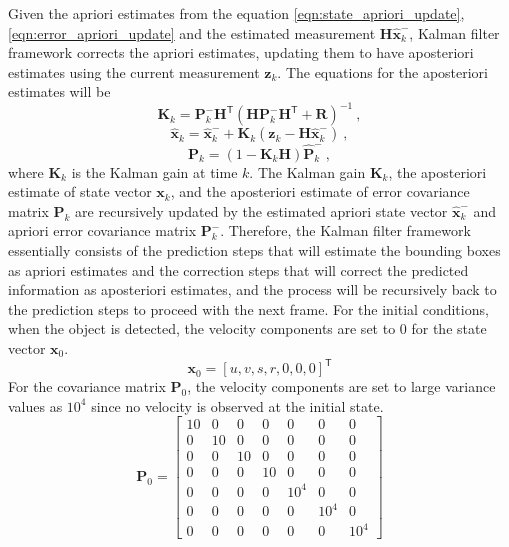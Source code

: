Given the apriori estimates from the equation \ref{eqn:state_apriori_update}, \ref{eqn:error_apriori_update} and the estimated measurement $\mathbf{H} \mathbf{\hat{x}}_{k}^-$, Kalman filter framework corrects the apriori estimates, updating them to have aposteriori estimates using the current measurement $\mathbf{z}_k$. The equations for the aposteriori estimates will be
\begin{equation}
\mathbf{K}_{k} = \mathbf{P}_{k}^{-} \mathbf{H}^\mathsf{T} (\mathbf{H} \mathbf{P}_{k}^{-} \mathbf{H}^\mathsf{T} + \mathbf{R} )^{-1} ~ ,
\label{eqn:Kalman_gain_update}
\end{equation}
\begin{equation}
\mathbf{\hat{x}}_{k} = \mathbf{\hat{x}}_{k}^- + \mathbf{K}_{k} (\mathbf{z}_k - \mathbf{H} \mathbf{\hat{x}}_{k}^-) ~ ,
\label{eqn:state_aposteriori_estimate}
\end{equation}
\begin{equation}
\mathbf{P}_k = (1 - \mathbf{K}_k \mathbf{H} ) \mathbf{\hat{P}}_k^- ~ ,
\label{eqn:error_aposteriori_estimate}
\end{equation}
where $\mathbf{K}_{k}$ is the Kalman gain at time $k$. The Kalman gain $\mathbf{K}_k$, the aposteriori estimate of state vector $\mathbf{x}_k$, and the aposteriori estimate of error covariance matrix $\mathbf{P}_k$ are recursively updated by the estimated apriori state vector $\mathbf{\hat{x}}_{k}^{-}$ and apriori error covariance matrix $\mathbf{P}_{k}^{-}$. Therefore, the Kalman filter framework essentially consists of the prediction steps that will estimate the bounding boxes as apriori estimates and the correction steps that will correct the predicted information as aposteriori estimates, and the process will be recursively back to the prediction steps to proceed with the next frame. For the initial conditions, when the object is detected, the velocity components are set to 0 for the state vector $\mathbf{x}_0$.
\begin{equation}
\mathbf{x}_{0} = [u, v, s, r, 0, 0, 0]^\mathsf{T}
\label{eqn:x_0}
\end{equation}
For the covariance matrix $\mathbf{P}_0$, the velocity components are set to large variance values as $10^4$ since no velocity is observed at the initial state.
\begin{equation}
\mathbf{P}_0 = \left[ \begin{matrix}   
  10  &  0  &  0  &  0  &  0  &  0  &  0 \\
  0  &  10  &  0  &  0  &  0  &  0  &  0 \\
  0  &  0  &  10  &  0  &  0  &  0  &  0 \\
  0  &  0  &  0  &  10  &  0  &  0  &  0 \\
  0  &  0  &  0  &  0  &  10^4  &  0  &  0 \\
  0  &  0  &  0  &  0  &  0  &  10^4  &  0 \\
  0  &  0  &  0  &  0  &  0  &  0  &  10^4 
  \end{matrix} \right]
\label{eqn:P_0}
\end{equation}
